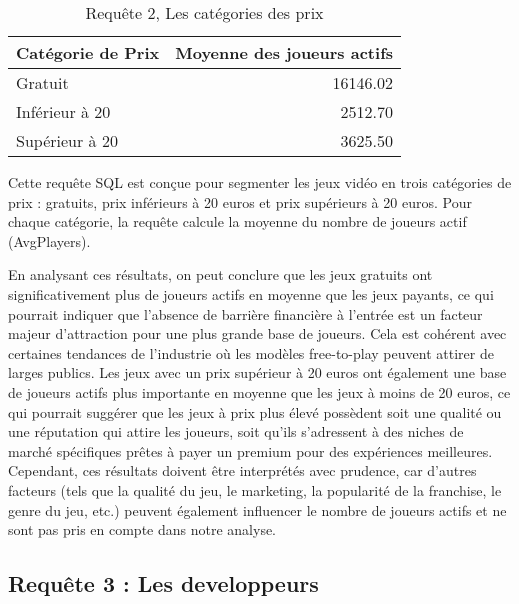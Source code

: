 \documentclass[mstat,12pt]{unswthesis}
\begin{document}
\begingroup\fontsize{10}{12}\selectfont

\begin{longtable}[t]{>{\raggedright\arraybackslash}p{4cm}r}
\caption{\label{tab:results-table catégorie prix invisible}Requête 2, Les catégories des prix}\\
\toprule
Catégorie de Prix & Moyenne des joueurs actifs\\
\midrule
Gratuit & 16146.02\\
Inférieur à 20 & 2512.70\\
Supérieur à 20 & 3625.50\\
\bottomrule
\end{longtable}
\endgroup{}

Cette requête SQL est conçue pour segmenter les jeux vidéo en trois
catégories de prix : gratuits, prix inférieurs à 20 euros et prix
supérieurs à 20 euros. Pour chaque catégorie, la requête calcule la
moyenne du nombre de joueurs actif (AvgPlayers).

En analysant ces résultats, on peut conclure que les jeux gratuits ont
significativement plus de joueurs actifs en moyenne que les jeux
payants, ce qui pourrait indiquer que l'absence de barrière financière à
l'entrée est un facteur majeur d'attraction pour une plus grande base de
joueurs. Cela est cohérent avec certaines tendances de l'industrie où
les modèles free-to-play peuvent attirer de larges publics. Les jeux
avec un prix supérieur à 20 euros ont également une base de joueurs
actifs plus importante en moyenne que les jeux à moins de 20 euros, ce
qui pourrait suggérer que les jeux à prix plus élevé possèdent soit une
qualité ou une réputation qui attire les joueurs, soit qu'ils
s'adressent à des niches de marché spécifiques prêtes à payer un premium
pour des expériences meilleures. Cependant, ces résultats doivent être
interprétés avec prudence, car d'autres facteurs (tels que la qualité du
jeu, le marketing, la popularité de la franchise, le genre du jeu, etc.)
peuvent également influencer le nombre de joueurs actifs et ne sont pas
pris en compte dans notre analyse.

\newpage

\hypertarget{requuxeate-3-les-developpeurs}{%
\subsection{Requête 3 : Les
developpeurs}\label{requuxeate-3-les-developpeurs}}

\begingroup\fontsize{10}{12}\selectfont
\end{document}
